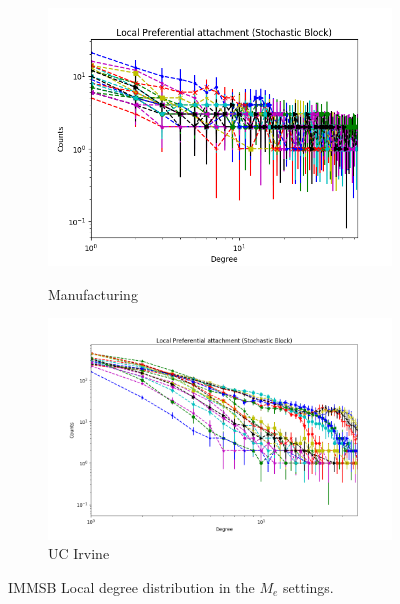 \begin{figure}[h]
\begin{subfigure}[b]{0.300\textwidth}
            \centering
            \includegraphics[width=\textwidth]{img/expe/5_ibp/figure_2}
            \label{fig:mean and std of net14}
            \caption {{\small Manufacturing}}    
        \end{subfigure}
        \begin{subfigure}[b]{0.300\textwidth}
            \centering
            \includegraphics[width=\textwidth]{img/expe/6_ibp/figure_2}
            \caption {{\small UC Irvine}}    
            \label{fig:mean and std of net14}
        \end{subfigure}
        \caption{IMMSB Local degree distribution in the $M_e$ settings. } 
        \label{fig:me_fit_lburst_ibp}
\end{figure}
